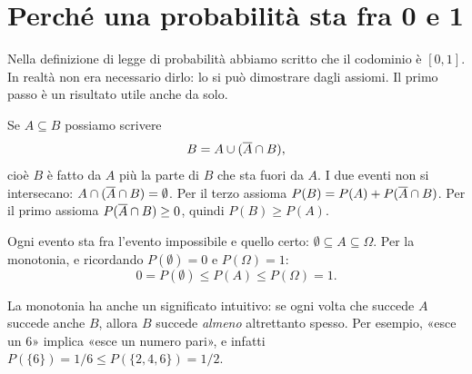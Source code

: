 
\section{Perché una probabilità sta fra 0 e 1}

Nella definizione di legge di probabilità abbiamo scritto che il codominio è $[0, 1]$. In realtà non era necessario
dirlo: lo si può dimostrare dagli assiomi. Il primo passo è un risultato utile anche da solo.


\begin{dimostrazione}
 Se $A \subseteq B$ possiamo scrivere
\[ B = A \cup (\overline{A} \cap B) , \]
cioè $B$ è fatto da $A$ più la parte di $B$ che sta fuori da $A$. I due eventi non si intersecano:
$A \cap (\overline{A} \cap B) = \emptyset$.
 Per il terzo assioma $P(B) = P(A) + P(\overline{A} \cap B)$.
 Per il primo assioma $P(\overline{A} \cap B) \geq 0$, quindi $P(B) \geq P(A)$.
\end{dimostrazione}


\begin{dimostrazione}
\passo{} Ogni evento sta fra l'evento impossibile e quello certo: $\emptyset \subseteq A \subseteq \Omega$. Per la
monotonia, e ricordando $P(\emptyset) = 0$ e $P(\Omega) = 1$:
\[ 0 = P(\emptyset) \leq P(A) \leq P(\Omega) = 1 . \]
\end{dimostrazione}

La monotonia ha anche un significato intuitivo: se ogni volta che succede $A$ succede anche $B$, allora $B$ succede
\emph{almeno} altrettanto spesso. Per esempio, «esce un 6» implica «esce un numero pari», e infatti
$P(\{6\}) = 1/6 \leq P(\{2,4,6\}) = 1/2$.

